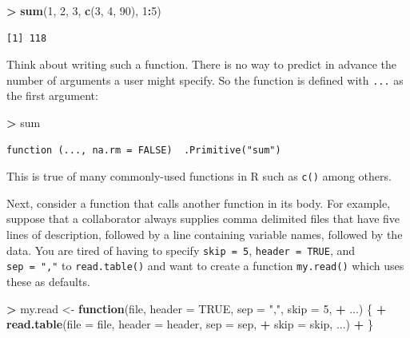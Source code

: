 \documentclass[]{krantz}
\makeatletter
\newenvironment{Shaded}{\begin{snugshade}}{\end{snugshade}}
\newcommand{\ControlFlowTok}[1]{\textcolor[rgb]{0.27,0.27,0.27}{\textbf{#1}}}
\newcommand{\DataTypeTok}[1]{\textcolor[rgb]{0.27,0.27,0.27}{#1}}
\newcommand{\DecValTok}[1]{\textcolor[rgb]{0.06,0.06,0.06}{#1}}
\newcommand{\KeywordTok}[1]{\textcolor[rgb]{0.27,0.27,0.27}{\textbf{#1}}}
\newcommand{\NormalTok}[1]{#1}
\newcommand{\OperatorTok}[1]{\textcolor[rgb]{0.43,0.43,0.43}{\textbf{#1}}}
\newcommand{\OtherTok}[1]{\textcolor[rgb]{0.37,0.37,0.37}{#1}}
\newcommand{\StringTok}[1]{\textcolor[rgb]{0.5,0.5,0.5}{#1}}
\newenvironment{kframe}{%
\medskip{}
\setlength{\fboxsep}{.8em}
 \def\at@end@of@kframe{}%
 \ifinner\ifhmode%
  \def\at@end@of@kframe{\end{minipage}}%
  \begin{minipage}{\columnwidth}%
 \fi\fi%
 \def\FrameCommand##1{\hskip\@totalleftmargin \hskip-\fboxsep
 \colorbox{shadecolor}{##1}\hskip-\fboxsep
     \hskip-\linewidth \hskip-\@totalleftmargin \hskip\columnwidth}%
 \MakeFramed {\advance\hsize-\width
   \@totalleftmargin\z@ \linewidth\hsize
   \@setminipage}}%
 {\par\unskip\endMakeFramed%
 \at@end@of@kframe}
\renewenvironment{Shaded}{\begin{kframe}}{\end{kframe}}
\makeatother
\begin{document}
\begin{Shaded}
\begin{Highlighting}[]
\OperatorTok{>}\StringTok{ }\KeywordTok{sum}\NormalTok{(}\DecValTok{1}\NormalTok{, }\DecValTok{2}\NormalTok{, }\DecValTok{3}\NormalTok{, }\KeywordTok{c}\NormalTok{(}\DecValTok{3}\NormalTok{, }\DecValTok{4}\NormalTok{, }\DecValTok{90}\NormalTok{), }\DecValTok{1}\OperatorTok{:}\DecValTok{5}\NormalTok{)}
\end{Highlighting}
\end{Shaded}

\begin{verbatim}
[1] 118
\end{verbatim}

Think about writing such a function. There is no way to predict in advance the number of arguments a user might specify. So the function is defined with \texttt{...} as the first argument:

\begin{Shaded}
\begin{Highlighting}[]
\OperatorTok{>}\StringTok{ }\NormalTok{sum}
\end{Highlighting}
\end{Shaded}

\begin{verbatim}
function (..., na.rm = FALSE)  .Primitive("sum")
\end{verbatim}

This is true of many commonly-used functions in R such as \texttt{c()} among others.

Next, consider a function that calls another function in its body. For example, suppose that a collaborator always supplies comma delimited files that have five lines of description, followed by a line containing variable names, followed by the data. You are tired of having to specify \texttt{skip\ =\ 5}, \texttt{header\ =\ TRUE}, and \texttt{sep\ =\ ","} to \texttt{read.table()} and want to create a function \texttt{my.read()} which uses these as defaults.

\begin{Shaded}
\begin{Highlighting}[]
\OperatorTok{>}\StringTok{ }\NormalTok{my.read <-}\StringTok{ }\ControlFlowTok{function}\NormalTok{(file, }\DataTypeTok{header =} \OtherTok{TRUE}\NormalTok{, }\DataTypeTok{sep =} \StringTok{","}\NormalTok{, }\DataTypeTok{skip =} \DecValTok{5}\NormalTok{, }
\OperatorTok{+}\StringTok{   }\NormalTok{...) \{}
\OperatorTok{+}\StringTok{   }\KeywordTok{read.table}\NormalTok{(}\DataTypeTok{file =}\NormalTok{ file, }\DataTypeTok{header =}\NormalTok{ header, }\DataTypeTok{sep =}\NormalTok{ sep, }
\OperatorTok{+}\StringTok{     }\DataTypeTok{skip =}\NormalTok{ skip, ...)}
\OperatorTok{+}\StringTok{ }\NormalTok{\}}
\end{Highlighting}
\end{Shaded}
\end{document}
